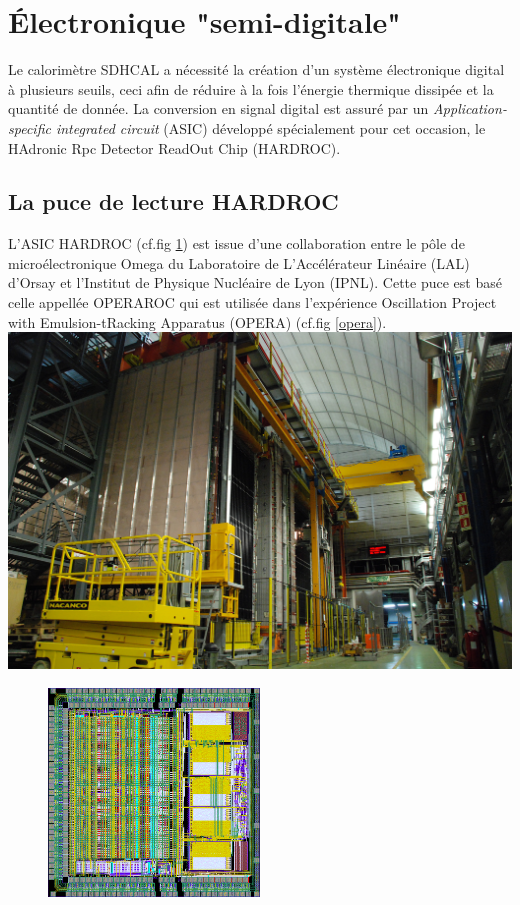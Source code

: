 \section{Électronique "semi-digitale"}
Le calorimètre SDHCAL a nécessité la création d'un système électronique digital à plusieurs seuils, ceci afin de réduire à la fois l'énergie thermique dissipée et la quantité de donnée. La conversion en signal digital est assuré par un \textit{Application-specific integrated circuit} (ASIC) développé spécialement pour cet occasion, le HAdronic Rpc Detector ReadOut Chip (HARDROC)\cite{Dulucq:2010ssa}.

\subsection{La puce de lecture HARDROC}
L'ASIC HARDROC (cf.fig \ref{hardroc}) est issue d'une collaboration entre le pôle de microélectronique Omega du Laboratoire de L'Accélérateur Linéaire (LAL) d'Orsay et l'Institut de Physique Nucléaire de Lyon (IPNL). Cette puce est basé celle appellée OPERAROC qui est utilisée dans l'expérience Oscillation Project with Emulsion-tRacking Apparatus (OPERA) (cf.fig \ref{opera}).
\marginpar
{
	\centering
	\includegraphics[width=\marginparwidth]{GLA/OPERA.jpg}
	\label{opera}
}
\begin{figure}[h!]
	\centering
	\includegraphics[width=0.5\textwidth]{GLA/HARDROC.png}
	\label{hardroc}
\end{figure}
